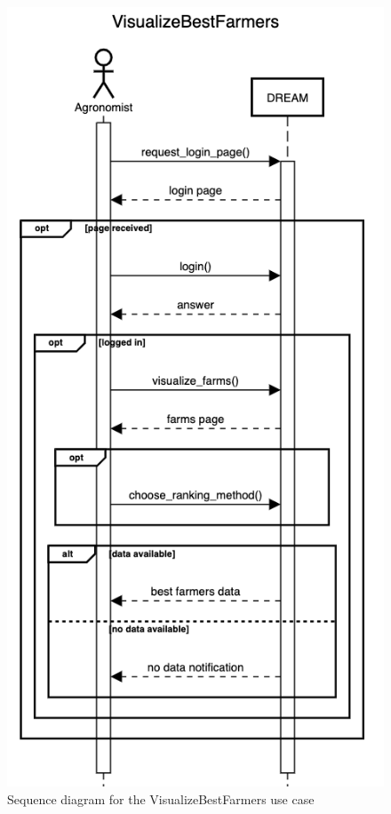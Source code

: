 \documentclass{article}
\begin{document}
\begin{figure}[H]
    \centering
	\includegraphics[scale=0.5]{sequence_diagrams/VisualizeBestFarmers}
    \caption{Sequence diagram for the VisualizeBestFarmers use case}
\end{figure}
\end{document}
